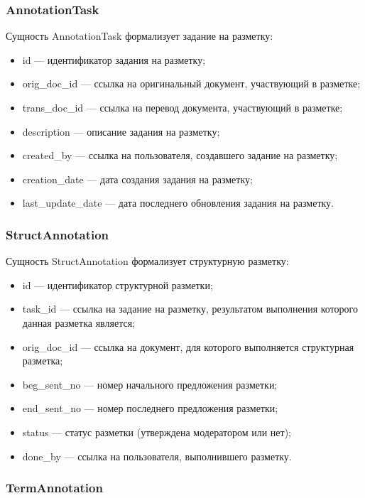 \subsubsection*{AnnotationTask}

Сущность AnnotationTask формализует задание на разметку:
\begin{itemize}
    \item id --- идентификатор задания на разметку;
    \item orig\_doc\_id --- ссылка на оригинальный документ, участвующий в разметке;
    \item trans\_doc\_id --- ссылка на перевод документа, участвующий в разметке;
    \item description --- описание задания на разметку;
    \item created\_by --- ссылка на пользователя, создавшего задание на разметку;
    \item creation\_date --- дата создания задания на разметку;
    \item last\_update\_date --- дата последнего обновления задания на разметку.
\end{itemize}

\subsubsection*{StructAnnotation}

Сущность StructAnnotation формализует структурную разметку:
\begin{itemize}
    \item id --- идентификатор структурной разметки;
    \item task\_id --- ссылка на задание на разметку, результатом выполнения которого данная разметка является;
    \item orig\_doc\_id --- ссылка на документ, для которого выполняется структурная разметка;
    \item beg\_sent\_no --- номер начального предложения разметки;
    \item end\_sent\_no --- номер последнего предложения разметки;
    \item status --- статус разметки (утверждена модератором или нет);
    \item done\_by --- ссылка на пользователя, выполнившего разметку.
\end{itemize}

\subsubsection*{TermAnnotation}

